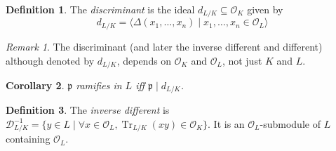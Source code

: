 \documentclass[11pt]{article}
\theoremstyle{definition}
\newtheorem{definition}{Definition}[subsection]
\theoremstyle{plain}
\newtheorem{corollary}[definition]{Corollary}
\theoremstyle{remark}
\newtheorem*{remark}{Remark}
\DeclareMathOperator{\Tr}{Tr}
\newcommand{\cD}{\mathcal{D}}
\newcommand{\cO}{\mathcal{O}}
\newcommand{\fp}{\mathfrak{p}}
\begin{document}
\begin{definition}
    The \emph{discriminant} is the ideal $d_{L / K} \subseteq \cO_K$ given by
    \begin{equation*}
        d_{L/K} = \langle \Delta(x_1, \ldots, x_n) \mid x_1, \ldots, x_n \in \cO_L \rangle
    \end{equation*}
\end{definition}

\begin{remark}
    The discriminant (and later the inverse different and different) although denoted by $d_{L/K}$, depends on $\cO_K$ and $\cO_L$, not just $K$ and $L$.
\end{remark}

\begin{corollary}\label{cor:12_4}
    $\fp$ ramifies in $L$ iff $\fp \mid d_{L/K}$.
\end{corollary}

\begin{definition}
    The \emph{inverse different} is $\cD_{L/K}^{-1} = \{y \in L \mid \forall x \in \cO_L, \Tr_{L/K}(xy) \in \cO_K \}$. It is an $\cO_L$-submodule of $L$ containing $\cO_L$.
\end{definition}
\end{document}

